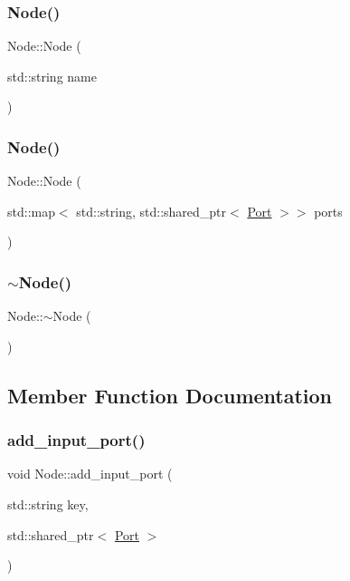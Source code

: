 \subsubsection{\texorpdfstring{Node()}{Node()}\hspace{0.1cm}{\footnotesize\ttfamily [2/3]}}
{\footnotesize\ttfamily Node\+::\+Node (\begin{DoxyParamCaption}\item[{std\+::string}]{name }\end{DoxyParamCaption})}

\mbox{\label{class_node_acdcee054c893b696b5bc08a8eba1a668}} 
\subsubsection{\texorpdfstring{Node()}{Node()}\hspace{0.1cm}{\footnotesize\ttfamily [3/3]}}
{\footnotesize\ttfamily Node\+::\+Node (\begin{DoxyParamCaption}\item[{std\+::map$<$ std\+::string, std\+::shared\+\_\+ptr$<$ \hyperlink{class_port}{Port} $>$$>$}]{ports }\end{DoxyParamCaption})}

\mbox{\label{class_node_aa0840c3cb5c7159be6d992adecd2097c}} 
\subsubsection{\texorpdfstring{$\sim$\+Node()}{~Node()}}
{\footnotesize\ttfamily Node\+::$\sim$\+Node (\begin{DoxyParamCaption}{ }\end{DoxyParamCaption})}



\subsection{Member Function Documentation}
\mbox{\label{class_node_ac0b67acb7c270cf38579356325ee6e9c}} 
\subsubsection{\texorpdfstring{add\+\_\+input\+\_\+port()}{add\_input\_port()}}
{\footnotesize\ttfamily void Node\+::add\+\_\+input\+\_\+port (\begin{DoxyParamCaption}\item[{std\+::string}]{key,  }\item[{std\+::shared\+\_\+ptr$<$ \hyperlink{class_port}{Port} $>$}]{ }\end{DoxyParamCaption})}

